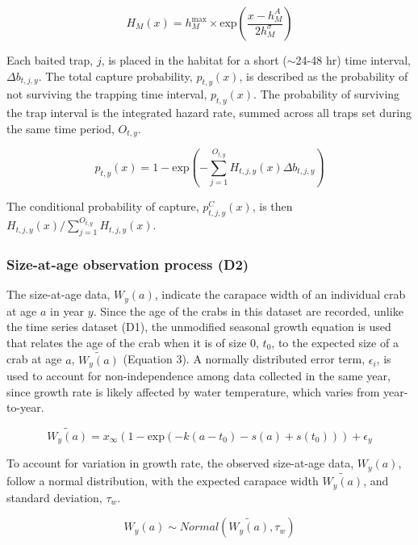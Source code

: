 \documentclass{article}
\begin{document}
\begin{equation}
H_M(x) = h^{\text{max}}_M \times \text{exp}(\frac{x-h^{A}_M}{2 h^{\sigma}_M})
\end{equation}

Each baited trap, $j$, is placed in the habitat for a short ($\sim$24-48 hr) time interval, $\Delta b_{t,j,y}$. The total capture probability, $p_{t,y}(x)$, is described as the probability of not surviving the trapping time interval, $p_{t,y}(x)$. The probability of surviving the trap interval is the integrated hazard rate, summed across all traps set during the same time period, $O_{t,y}$.

\begin{equation}
p_{t,y}(x) = 1-\text{exp}\left(-\sum_{j=1}^{O_{t,y}} H_{t,j,y}(x)\Delta b_{t,j,y}\right)
\end{equation}

The conditional probability of capture, $p^C_{t,j,y}(x)$, is then $H_{t,j,y}(x)/\sum_{j=1}^{O_{t,y}}H_{t,j,y}(x)$.

\subsubsection*{Size-at-age observation process (D2)}

The size-at-age data, $W_y(a)$, indicate the carapace width of an individual crab at age $a$ in year $y$. Since the age of the crabs in this dataset are recorded, unlike the time series dataset (D1), the unmodified seasonal growth equation is used that relates the age of the crab when it is of size 0, $t_0$, to the expected size of a crab at age $a$, $\widetilde{W_y(a)}$ (Equation 3). A normally distributed error term, $\epsilon_i$, is used to account for non-independence among data collected in the same year, since growth rate is likely affected by water temperature, which varies from year-to-year.

\begin{equation}
\widetilde{W_y(a)} = x_{\infty}(1-\text{exp}(-k(a-t_0) - s(a) + s(t_0))) + \epsilon_y
\end{equation}

To account for variation in growth rate, the observed size-at-age data, $W_y(a)$, follow a normal distribution, with the expected carapace width $\widetilde{W_y(a)}$, and standard deviation, $\tau_{w}$.

\begin{equation}
W_y(a) \sim Normal(\widetilde{W_y(a)}, \tau_{w})
\end{equation}
\end{document}
